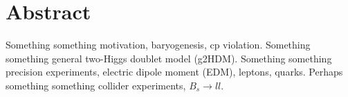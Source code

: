 \chapter{Abstract}
\label{ch:abstract}
Something something motivation, baryogenesis, cp violation. 
Something something general two-Higgs doublet model (g2HDM). 
Something something precision experiments, electric dipole moment (EDM), leptons, quarks. 
Perhaps something something collider experiments, \(B_{s} \to ll \).